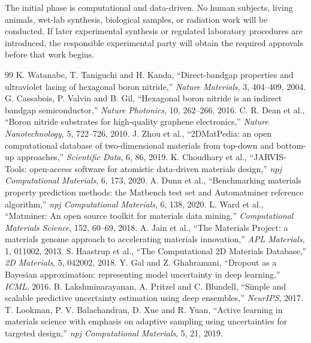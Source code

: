 \documentclass[10pt,a4paper]{article}
\begin{document}
The initial phase is computational and data-driven. No human subjects, living animals, wet-lab synthesis, biological samples, or radiation work will be conducted. If later experimental synthesis or regulated laboratory procedures are introduced, the responsible experimental party will obtain the required approvals before that work begins.

\small
\renewcommand{\refname}{Selected References}
\begin{thebibliography}{99}
\setlength{\itemsep}{-2pt}
 K. Watanabe, T. Taniguchi and H. Kanda, ``Direct-bandgap properties and ultraviolet lasing of hexagonal boron nitride,'' \textit{Nature Materials}, 3, 404--409, 2004.
 G. Cassabois, P. Valvin and B. Gil, ``Hexagonal boron nitride is an indirect bandgap semiconductor,'' \textit{Nature Photonics}, 10, 262--266, 2016.
 C. R. Dean et al., ``Boron nitride substrates for high-quality graphene electronics,'' \textit{Nature Nanotechnology}, 5, 722--726, 2010.
 J. Zhou et al., ``2DMatPedia: an open computational database of two-dimensional materials from top-down and bottom-up approaches,'' \textit{Scientific Data}, 6, 86, 2019.
 K. Choudhary et al., ``JARVIS-Tools: open-access software for atomistic data-driven materials design,'' \textit{npj Computational Materials}, 6, 173, 2020.
 A. Dunn et al., ``Benchmarking materials property prediction methods: the Matbench test set and Automatminer reference algorithm,'' \textit{npj Computational Materials}, 6, 138, 2020.
 L. Ward et al., ``Matminer: An open source toolkit for materials data mining,'' \textit{Computational Materials Science}, 152, 60--69, 2018.
 A. Jain et al., ``The Materials Project: a materials genome approach to accelerating materials innovation,'' \textit{APL Materials}, 1, 011002, 2013.
 S. Haastrup et al., ``The Computational 2D Materials Database,'' \textit{2D Materials}, 5, 042002, 2018.
 Y. Gal and Z. Ghahramani, ``Dropout as a Bayesian approximation: representing model uncertainty in deep learning,'' \textit{ICML}, 2016.
 B. Lakshminarayanan, A. Pritzel and C. Blundell, ``Simple and scalable predictive uncertainty estimation using deep ensembles,'' \textit{NeurIPS}, 2017.
 T. Lookman, P. V. Balachandran, D. Xue and R. Yuan, ``Active learning in materials science with emphasis on adaptive sampling using uncertainties for targeted design,'' \textit{npj Computational Materials}, 5, 21, 2019.

\end{thebibliography}
\end{document}
